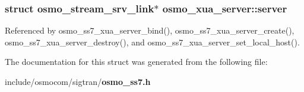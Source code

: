\subsubsection[{server}]{\setlength{\rightskip}{0pt plus 5cm}struct osmo\+\_\+stream\+\_\+srv\+\_\+link$\ast$ osmo\+\_\+xua\+\_\+server\+::server}\label{structosmo__xua__server_a077845fe1f5e0b1fd26e373e0ba986f1}


Referenced by osmo\+\_\+ss7\+\_\+xua\+\_\+server\+\_\+bind(), osmo\+\_\+ss7\+\_\+xua\+\_\+server\+\_\+create(), osmo\+\_\+ss7\+\_\+xua\+\_\+server\+\_\+destroy(), and osmo\+\_\+ss7\+\_\+xua\+\_\+server\+\_\+set\+\_\+local\+\_\+host().



The documentation for this struct was generated from the following file\+:\begin{DoxyCompactItemize}
\item 
include/osmocom/sigtran/{\bf osmo\+\_\+ss7.\+h}\end{DoxyCompactItemize}
